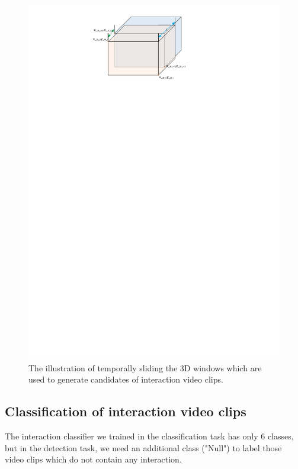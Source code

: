 \begin{figure}
	\includegraphics[trim=2cm 23.5cm 0cm 1cm]{fig01/sliding_window.pdf}
	\caption{The illustration of temporally sliding the 3D windows which are used to generate candidates of interaction video clips.}
	\label{fig:sliding_window}
\end{figure}

\subsection{Classification of interaction video clips}
The interaction classifier we trained in the classification task has only 6 classes, but in the detection task, we need an additional class ("Null") to label those video clips which do not contain any interaction. 
